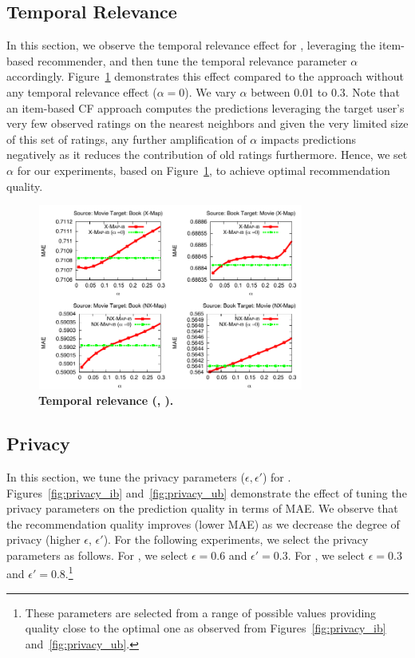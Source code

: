\subsection{Temporal Relevance}
In this section, we observe the temporal relevance effect for \crossrec, leveraging the item-based recommender, and then tune the temporal relevance parameter $\alpha$ accordingly. Figure~\ref{fig:temporal} demonstrates this effect compared to the approach without any temporal relevance effect ($\alpha=0$). We vary $\alpha$ between 0.01 to 0.3. Note that an item-based CF approach computes the predictions leveraging the target user's very few observed ratings on the nearest neighbors and given the very limited size of this set of ratings, any further amplification of $\alpha$ impacts predictions negatively as it reduces the contribution of old ratings furthermore. Hence, we set $\alpha$ for our experiments, based on Figure~\ref{fig:temporal}, to achieve optimal recommendation quality.%
\begin{figure}
\begin{center}
\hspace{-3mm}\includegraphics[height=2.4in,width=3.45in]{figures/Temporal_relevance.pdf}
\vspace{-8mm}
\caption{{\bf Temporal relevance (\crossrec, \npcrossrec).}}
\label{fig:temporal}
\end{center}
\end{figure}
\subsection{Privacy}
In this section, we tune the privacy parameters ($\epsilon, \epsilon'$) for \crossrec. Figures~\ref{fig:privacy_ib} and~\ref{fig:privacy_ub} demonstrate the effect of tuning the privacy parameters on the prediction quality in terms of MAE. We observe that the recommendation quality improves (lower MAE) as we decrease the degree of privacy (higher $\epsilon$, $\epsilon'$). For the following experiments, we select the privacy parameters as follows. For \crossrecub, we select $\epsilon=0.6$ and $\epsilon'=0.3$. For \crossrecib, we select $\epsilon=0.3$ and $\epsilon'=0.8$.\footnote{These parameters are selected from a range of possible values providing quality close to the optimal one as observed from Figures~\ref{fig:privacy_ib} and~\ref{fig:privacy_ub}.}

